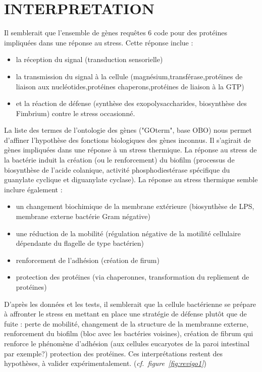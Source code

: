 \documentclass[a4paper,11pt,openright]{report}
\begin{document}
 
    




\chapter{INTERPRETATION}
\thispagestyle{empty}
\clearpage
\newpage

Il semblerait que l'ensemble de gènes requêtes 6 code pour des protéines impliquées dans une réponse au stress. Cette réponse inclue :
\begin{itemize}
	\item la réception du signal (transduction sensorielle)
	\item la transmission du signal à la cellule (magnésium,transférase,protéines de liaison aux nucléotides,protéines chaperons,protéines de liaison à la GTP)
	\item et la réaction de défense (synthèse des exopolysaccharides, biosynthèse des Fimbrium) contre le stress occasionné.
\end{itemize}

La liste des termes de l'ontologie des gènes ("GOterm", base OBO) nous permet d'affiner l'hypothèse des fonctions biologiques des gènes inconnus. Il s'agirait de gènes impliquées dans une réponse à un stress thermique. La réponse au stress de la bactérie induit la création (ou le renforcement) du biofilm (processus de biosynthèse de l'acide colanique, activité phosphodiestérase spécifique du guanylate cyclique et diguanylate cyclase). La réponse au stress thermique semble inclure également :
 \begin{itemize}
\item  un changement biochimique de la membrane extérieure (biosynthèse de LPS, membrane externe bactérie Gram négative)
\item une réduction de la mobilité (régulation négative de la motilité cellulaire dépendante du flagelle de type bactérien)
\item renforcement de l'adhésion (création de firum)
\item protection des protéines (via chaperonnes, transformation du repliement de protéines)
\end{itemize}
D'après les données et les tests, il semblerait que la cellule bactérienne se prépare à affronter le stress en mettant en place une stratégie de défense plutôt que de fuite : perte de mobilité, changement de la structure de la membranne externe, renforcement du biofilm (bloc avec les bactéries voisines), création de fibrum qui renforce le phénomène d'adhésion (aux cellules eucaryotes de la paroi intestinal par exemple?) protection des protéines. Ces interprétations restent des hypothèses, à valider expérimentalement.
 (\textit{cf.~figure~\ref{fig:revigo1}})
\end{document}
